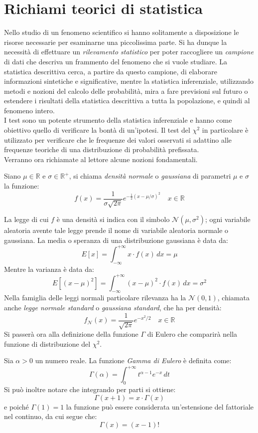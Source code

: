 \chapter{Richiami teorici di statistica}
Nello studio di un fenomeno scientifico si hanno solitamente a disposizione le risorse necessarie per esaminarne una piccolissima parte. Si ha dunque la necessità di effettuare un \textit{rilevamento statistico} per poter raccogliere un \textit{campione} di dati che descriva un frammento del fenomeno che si vuole studiare. La statistica descrittiva cerca, a partire da questo campione, di elaborare informazioni sintetiche e significative, mentre la statistica inferenziale, utilizzando metodi e nozioni del calcolo delle probabilità, mira a fare previsioni sul futuro o estendere i risultati della statistica descrittiva a tutta la popolazione, e quindi al fenomeno intero.\\
		I test sono un potente strumento della statistica inferenziale e hanno come obiettivo quello di verificare la bontà di un'ipotesi. Il test del $\chi ^2$ in particolare è utilizzato per verificare che le frequenze dei valori osservati si adattino alle frequenze teoriche di una distribuzione di probabilità prefissata.\\ Verranno ora richiamate al lettore alcune nozioni fondamentali.\\
		\begin{defn}
		Siano $\mu \in \mathbb{R}$ e $\sigma \in \mathbb{R} ^+$, si chiama \textit{densità normale} o \textit{gaussiana} di parametri $\mu$ e $\sigma$ la funzione:
		\[ f(x) = \frac{1}{\sigma \sqrt{2\pi}}e^{-\frac{1}{2} (x-\mu / \sigma)^2 } \quad x\in\mathbb{R}\]
		\end{defn}
		\noindent La legge di cui $f$ è una densità si indica con il simbolo $\mathcal{N}(\mu ,\sigma ^2)$; ogni variabile aleatoria avente
tale legge prende il nome di variabile aleatoria normale o gaussiana. La media o speranza di una distribuzione gaussiana è data da:
\[E[x]=\int_{-\infty}^{+\infty}x\cdot f(x)\, dx=\mu \]
Mentre la varianza è data da:
\[E[(x-\mu)^2]=\int_{-\infty}^{+\infty}(x-\mu)^2 \cdot f(x)\, dx=\sigma ^2 \]
Nella famiglia delle leggi normali particolare rilevanza ha la $\mathcal{N}(0 ,1)$, chiamata anche \textit{legge normale standard} o \textit{gaussiana standard}, che ha per densità:
\[ f_{\mathcal{N}}(x) = \frac{1}{\sqrt{2\pi}}e^{-{x^2}/{2}} \quad x\in\mathbb{R}\]
Si passerà ora alla definizione della funzione $\Gamma$ di Eulero che comparirà nella funzione di distribuzione del $\chi ^2$.	
		\begin{defn}
		 Sia $\alpha > 0$ un numero reale. La funzione \textit{Gamma di Eulero} è definita come:
			\[\Gamma(\alpha)=\int_{0}^{+\infty}t^{\alpha-1}e^{-x}\, dt\]
			Si può inoltre notare che integrando per parti si ottiene:
			\[\Gamma(x+1)=x\cdot \Gamma(x)\]
			e poiché $\Gamma(1)=1$ la funzione può essere considerata un'estensione del fattoriale nel continuo, da cui segue che:
			\[\Gamma(x)=(x-1)!\]
		\end{defn}

